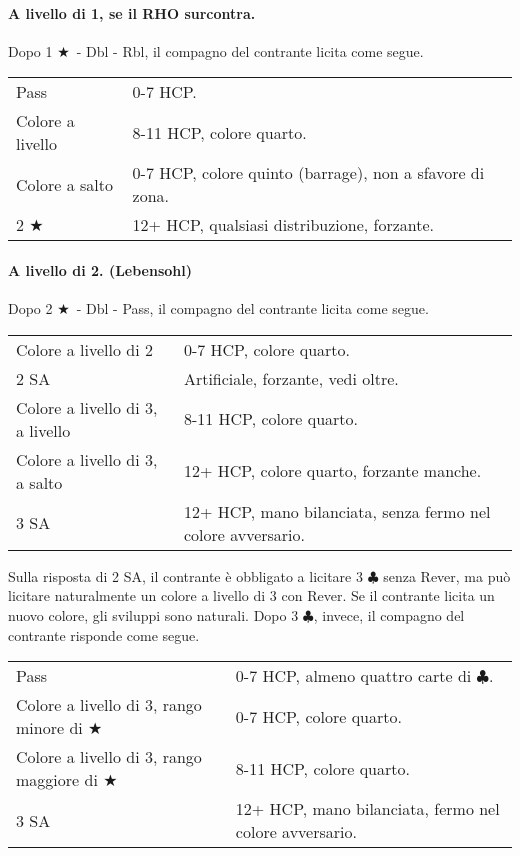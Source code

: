 \documentclass[a4paper,10pt]{article}
\renewcommand{\c}{$\clubsuit$\xspace}
\renewcommand{\j}{$\bigstar$\xspace}
\newcommand{\sa}{SA\xspace}
\newcommand{\smallspace}{\vskip0.3cm}
\newenvironment{twocol}
  {\smallspace\noindent\begin{tabular}{l p{0.78\textwidth}}}
  {\end{tabular}\smallspace}
\begin{document}
\paragraph{A livello di 1, se il RHO surcontra.} Dopo 1 \j\ - Dbl - Rbl, il compagno del contrante licita come segue.

\begin{twocol}
	Pass & 0-7 HCP. \\
	Colore a livello & 8-11 HCP, colore quarto. \\
	Colore a salto & 0-7 HCP, colore quinto (barrage), non a sfavore di zona. \\
	2 \j & 12+ HCP, qualsiasi distribuzione, forzante. \\
\end{twocol}

\paragraph{A livello di 2. (Lebensohl)} Dopo 2 \j\ - Dbl - Pass, il compagno del contrante licita come segue.


\begin{twocol}
	Colore a livello di 2 & 0-7 HCP, colore quarto. \\
	2 \sa & Artificiale, forzante, vedi oltre. \\
	Colore a livello di 3, a livello & 8-11 HCP, colore quarto. \\
	Colore a livello di 3, a salto & 12+ HCP, colore quarto, forzante manche. \\
	3 \sa & 12+ HCP, mano bilanciata, senza fermo nel colore avversario.
\end{twocol}

Sulla risposta di 2 \sa, il contrante è obbligato a licitare 3 \c senza Rever, ma può licitare naturalmente un colore a livello di 3 con Rever. Se il contrante licita un nuovo colore, gli sviluppi sono naturali. Dopo 3 \c, invece, il compagno del contrante risponde come segue.

\begin{twocol}
	Pass & 0-7 HCP, almeno quattro carte di \c. \\
	Colore a livello di 3, rango minore di \j & 0-7 HCP, colore quarto. \\
	Colore a livello di 3, rango maggiore di \j & 8-11 HCP, colore quarto. \\
	3 \sa & 12+ HCP, mano bilanciata, fermo nel colore avversario.
\end{twocol}
\end{document}
